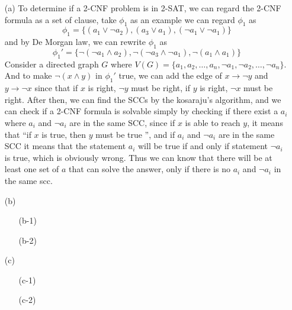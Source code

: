 \documentclass{homework}
\begin{document}
\begin{itemize}
    \item[(a)]
    To determine if a 2-CNF problem is in 2-SAT, we can regard the 2-CNF formula as a set of clause, take $\phi_1$ as an example we can regard $\phi_1$ as 
    \[\phi_1 = \{(a_1\vee \lnot a_2), (a_3 \vee a_1), (\lnot a_1 \vee \lnot a_1)\}\] 
    and by De Morgan law, we can rewrite $\phi_1$ as 
    \[\phi_1 ' = \{\lnot(\lnot a_1 \wedge  a_2), \lnot(\lnot a_3 \wedge \lnot a_1), \lnot(a_1 \wedge a_1)\}\]
    Consider a directed graph $G$ where $V(G) = \{a_1, a_2,\ldots,a_n, \lnot a_1, \lnot a_2,\ldots,\lnot a_n\}$. And to make $\lnot(x \wedge y)$ in $\phi_1'$ true, we can add the edge of $x \rightarrow \lnot y$ and $y \rightarrow \lnot x$ since that if $x$ is right, $\lnot y$ must be right, if  $y$ is right, $\lnot x$ must be right.
    After then, we can find the SCCs by the kosaraju's algorithm, and we can check if a 2-CNF formula is solvable simply by checking if there exist a $a_i$ where $a_i$ and $\lnot a_i$ are in the same SCC, since if $x$ is able to reach $y$, it means that ``if $x$ is true, then $y$ must be true '', and if $a_i$ and $\lnot a_i$ are in the same SCC it means that the statement $a_i$ will be true if and only if statement $\lnot a_i$ is true, which is obviously wrong. Thus we can know that there will be at least one set of $a$ that can solve the answer, only if there is no $a_i$ and $\lnot a_i$ in the same scc.

    \item[(b)] 
    \begin{itemize}
        \item[(b-1)]%

        \item[(b-2)]%
        

    \end{itemize}
    \item[(c)] 
    \begin{itemize}
        \item[(c-1)]%
        

        \item[(c-2)]%
        

    \end{itemize}
\end{itemize}
\clearpage
\end{document}
